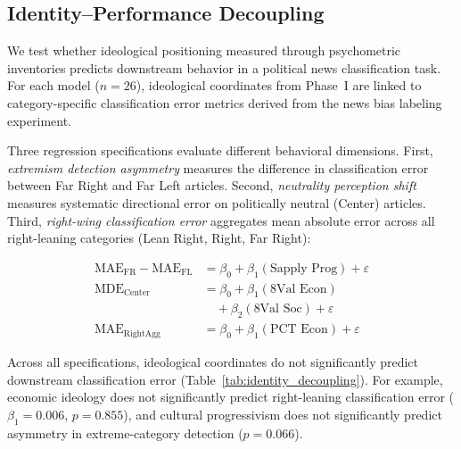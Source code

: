 \documentclass[11pt]{article}
\begin{document}
\subsection{Identity--Performance Decoupling}

We test whether ideological positioning measured through psychometric inventories predicts downstream behavior in a political news classification task. For each model ($n=26$), ideological coordinates from Phase~I are linked to category-specific classification error metrics derived from the news bias labeling experiment.

Three regression specifications evaluate different behavioral dimensions. First, \textit{extremism detection asymmetry} measures the difference in classification error between Far Right and Far Left articles. Second, \textit{neutrality perception shift} measures systematic directional error on politically neutral (Center) articles. Third, \textit{right-wing classification error} aggregates mean absolute error across all right-leaning categories (Lean Right, Right, Far Right):

\begin{align*}
\text{MAE}_{\text{FR}}-\text{MAE}_{\text{FL}} &= \beta_0 + \beta_1(\text{Sapply Prog}) + \varepsilon \\
\text{MDE}_{\text{Center}} &= \beta_0 + \beta_1(\text{8Val Econ}) \\
&\quad + \beta_2(\text{8Val Soc}) + \varepsilon \\
\text{MAE}_{\text{RightAgg}} &= \beta_0 + \beta_1(\text{PCT Econ}) + \varepsilon
\end{align*}

Across all specifications, ideological coordinates do not significantly predict downstream classification error (Table~\ref{tab:identity_decoupling}). For example, economic ideology does not significantly predict right-leaning classification error ($\beta_1=0.006$, $p=0.855$), and cultural progressivism does not significantly predict asymmetry in extreme-category detection ($p=0.066$).
\end{document}
